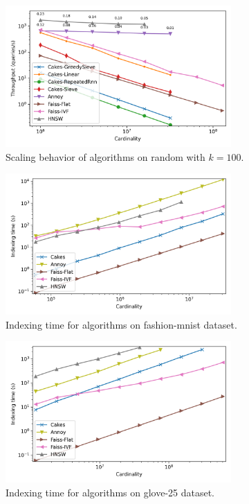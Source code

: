 \documentclass{article}
\begin{document}
\begin{figure}[ht!]
    \centering
    \includegraphics[width=3.4in]{plots/random-knn-100.png}
    \caption{
        Scaling behavior of algorithms on random with $k=100$. 
    }
    \label{fig:supplement:random-k-100}
\end{figure}

\begin{figure}[ht!]
    \centering
    \includegraphics[width=3.4in]{plots/fashion-mnist-indexing.png}
    \caption{
        Indexing time for algorithms on fashion-mnist dataset. 
    }
    \label{fig:supplement:fashion-mnist-indexing}
\end{figure}

\begin{figure}[ht!]
    \centering
    \includegraphics[width=3.4in]{plots/glove-25-indexing.png}
    \caption{
        Indexing time for algorithms on glove-25 dataset. 
    }
    \label{fig:supplement:glove-25-indexing}
\end{figure}
\end{document}
